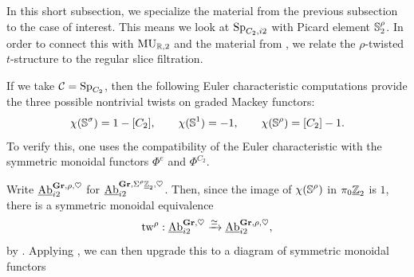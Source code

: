 In this short subsection, we specialize the material from the previous subsection to the case of interest. This means we look at $\operatorname{\mathrm{Sp}}_{C_2, i2}$ with Picard element $\operatorname{\mathbb{S}}_2 ^\rho$.
In order to connect this with $\operatorname{\mathrm{MU}}_{\mathbb{R},2}$ and the material from , we relate the $\rho$-twisted $t$-structure to the regular slice filtration.

\begin{exm}
  If we take $\mathcal{C}= \operatorname{\mathrm{Sp}}_{C_2}$, then the following Euler characteristic computations provide the three possible nontrivial twists on graded Mackey functors:
  \[ \chi(\operatorname{\mathbb{S}}^{\sigma}) = 1 - [C_2], \qquad \chi(\operatorname{\mathbb{S}}^1) = -1, \qquad \chi(\operatorname{\mathbb{S}}^{\rho}) = [C_2] - 1. \]
  To verify this, one uses the compatibility of the Euler characteristic with the symmetric monoidal functors $\Phi^{e}$ and $\Phi^{C_2}$.
\end{exm}

\begin{exm}
  Write $\underline{\mathrm{Ab}}_{i2}^{\operatorname{\mathbf{Gr}}, \rho, \heartsuit}$ for $\underline{\mathrm{Ab}}_{i2}^{\operatorname{\mathbf{Gr}}, \Sigma^{\rho} \underline{\mathbb{Z}}_{2}, \heartsuit}$.
  Then, since the image of $\chi(\operatorname{\mathbb{S}}^{\rho})$ in $\pi_0 \underline{\mathbb{Z}}_{2}$ is $1$,
  there is a symmetric monoidal equivalence
  \[\mathrm{tw}^{\rho} : \underline{\mathrm{Ab}}_{i2}^{\operatorname{\mathbf{Gr}}, \heartsuit} \xrightarrow{\simeq} \underline{\mathrm{Ab}}_{i2}^{\operatorname{\mathbf{Gr}}, \rho, \heartsuit},\]
  by . Applying , we can then upgrade this to a diagram of symmetric monoidal functors
  \begin{center}
  \end{center}
\end{exm}


